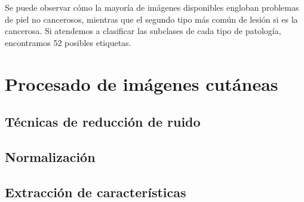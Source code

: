 Se puede observar cómo la mayoría de imágenes disponibles engloban problemas de piel no cancerosos, mientras que el segundo tipo más común de lesión si es la cancerosa. Si atendemos a clasificar las subclases de cada tipo de patología, encontramos 52 posibles etiquetas.



\section{Procesado de imágenes cutáneas}
\subsection{Técnicas de reducción de ruido}
\subsection{Normalización}
\subsection{Extracción de características}


